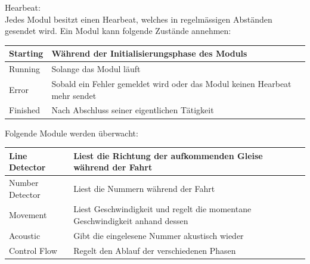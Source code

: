 \documentclass[../../main.tex]{subfiles}
\begin{document}
Hearbeat:\\
Jedes Modul besitzt einen Hearbeat, welches in regelmässigen Abständen gesendet wird. Ein Modul kann folgende Zustände annehmen:
\begin{table}[H]
    \begin{tabular}{ll}
    \hline
    Starting & Während der Initialisierungsphase des Moduls \\ \hline
    Running & Solange das Modul läuft\\ \hline
    Error & Sobald ein Fehler gemeldet wird oder das Modul keinen Hearbeat mehr sendet\\ \hline
    Finished & Nach Abschluss seiner eigentlichen Tätigkeit\\ \hline
    \end{tabular}
\end{table} 
Folgende Module werden überwacht:
\begin{table}[H]
    \begin{tabular}{ll}
    \hline
    Line Detector & Liest die Richtung der aufkommenden Gleise während der Fahrt \\ \hline
    Number Detector & Liest die Nummern während der Fahrt\\ \hline
    Movement & Liest Geschwindigkeit und regelt die momentane Geschwindigkeit anhand dessen\\ \hline
    Acoustic & Gibt die eingelesene Nummer akustisch wieder\\ \hline
    Control Flow & Regelt den Ablauf der verschiedenen Phasen \\ \hline
    \end{tabular}
\end{table}
\end{document}
